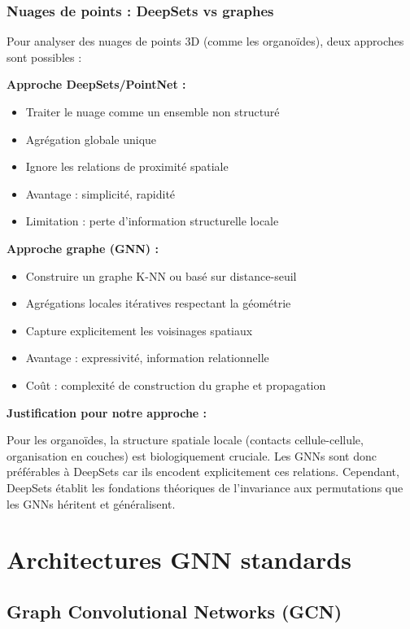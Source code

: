 \subsubsection{Nuages de points : DeepSets vs graphes}

Pour analyser des nuages de points 3D (comme les organoïdes), deux approches sont possibles :

\textbf{Approche DeepSets/PointNet :}
\begin{itemize}
    \item Traiter le nuage comme un ensemble non structuré
    \item Agrégation globale unique
    \item Ignore les relations de proximité spatiale
    \item Avantage : simplicité, rapidité
    \item Limitation : perte d'information structurelle locale
\end{itemize}

\textbf{Approche graphe (GNN) :}
\begin{itemize}
    \item Construire un graphe K-NN ou basé sur distance-seuil
    \item Agrégations locales itératives respectant la géométrie
    \item Capture explicitement les voisinages spatiaux
    \item Avantage : expressivité, information relationnelle
    \item Coût : complexité de construction du graphe et propagation
\end{itemize}

\textbf{Justification pour notre approche :}

Pour les organoïdes, la structure spatiale locale (contacts cellule-cellule, organisation en couches) est biologiquement cruciale. Les GNNs sont donc préférables à DeepSets car ils encodent explicitement ces relations. Cependant, DeepSets établit les fondations théoriques de l'invariance aux permutations que les GNNs héritent et généralisent.

\section{Architectures GNN standards}

\subsection{Graph Convolutional Networks (GCN)}

